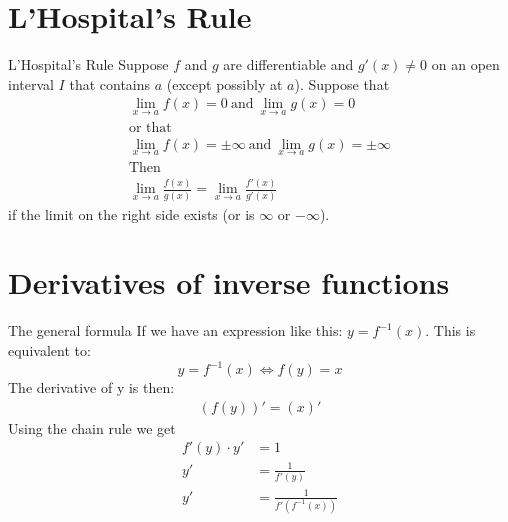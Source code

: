 \documentclass[letterpaper,10pt,twoside,twocolumn,openany]{book}
\begin{document}
\section{L'Hospital's Rule}
\begin{DndSidebar}{L'Hospital's Rule}
    Suppose $f$ and $g$ are differentiable and $g'(x) \neq 0$ on an open interval $I$ that contains $a$ (except possibly at $a$). Suppose that
    \begin{gather*}
        \lim_{x\to a} f(x) = 0\ \text{and}\ \lim_{x\to a} g(x) = 0\\
        \text{or that}\\
        \lim_{x\to a} f(x) = \pm\infty\ \text{and}\ \lim_{x\to a} g(x)= \pm\infty\\
        \text{Then}\\ 
        \lim_{x\to a}\frac{f(x)}{g(x)} = \lim_{x\to a} \frac{f'(x)}{g'(x)}
    \end{gather*}
    if the limit on the right side exists (or is $\infty$ or $-\infty$).
\end{DndSidebar}
\newpage
\section{Derivatives of inverse functions}
\begin{DndSidebar}{The general formula}
    If we have an expression like this: $ y = f^{-1}(x)$. This is equivalent to:
    \begin{equation}
        y = f^{-1}(x) \Leftrightarrow f(y) = x
    \end{equation}
    The derivative of y is then:
    \begin{align*}
        (f(y))' = (x)'
    \end{align*}
    Using the chain rule we get
    \begin{align*}
        f'(y)\cdot y' &= 1\\
        y' &= \frac{1}{f'(y)}\\
        y' &= \frac{1}{f'(f^{-1}(x))}
    \end{align*}    
\end{DndSidebar}
\end{document}
